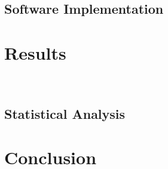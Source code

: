 \documentclass[parskip=full]{scrartcl}
\begin{document}


\subsection{Software Implementation}

\section{Results}~\label{sec:results}

\subsection{Statistical Analysis}

\section{Conclusion}~\label{sec:conclusion}



\end{document}
